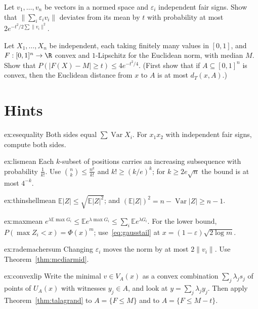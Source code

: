 \begin{exercise}[$\star\star$]\label{ex:rademachersum}
Let $v_1,\dots,v_n$ be vectors in a normed space and $\varepsilon_i$ independent fair signs. Show that $\|\sum_i\varepsilon_iv_i\|$ deviates from its mean by $t$ with probability at most
$2e^{-t^2/2\sum\|v_i\|^2}$.
\end{exercise}

\begin{exercise}[$\star\star\star$]\label{ex:convexlip}
Let $X_1,\dots,X_n$ be independent, each taking finitely many values in $[0,1]$, and $F:[0,1]^n\to\R$ convex and $1$-Lipschitz for the Euclidean norm, with median $M$. Show that
$P(|F(X)-M|\ge t)\le4e^{-t^2/4}$. (First show that if $A\subseteq[0,1]^n$ is convex, then the Euclidean distance from $x$ to $A$ is at most $d_T(x,A)$.)
\end{exercise}

\section{Hints}

\begin{hint}{ex:esequality}
Both sides equal $\sum\operatorname{Var}X_i$. For $x_1x_2$ with independent fair signs, compute both sides.
\end{hint}
\begin{hint}{ex:lismean}
Each $k$-subset of positions carries an increasing subsequence with probability $\frac1{k!}$. Use $\binom nk\le\frac{n^k}{k!}$ and $k!\ge(k/e)^k$; for $k\ge2e\sqrt n$ the bound is at most $4^{-k}$.
\end{hint}
\begin{hint}{ex:thinshellmean}
$\mathbb E|Z|\le\sqrt{\mathbb E|Z|^2}$; and $(\mathbb E|Z|)^2=n-\operatorname{Var}|Z|\ge n-1$.
\end{hint}
\begin{hint}{ex:maxmean}
$e^{\lambda\mathbb E\max G_i}\le\mathbb Ee^{\lambda\max G_i}\le\sum_i\mathbb Ee^{\lambda G_i}$. For the lower bound, $P(\max Z_i<x)=\Phi(x)^m$; use~\eqref{eq:gausstail} at $x=(1-\varepsilon)\sqrt{2\log m}$.
\end{hint}
\begin{hint}{ex:rademachersum}
Changing $\varepsilon_i$ moves the norm by at most $2\|v_i\|$. Use Theorem~\ref{thm:mcdiarmid}.
\end{hint}
\begin{hint}{ex:convexlip}
Write the minimal $v\in V_A(x)$ as a convex combination $\sum_j\lambda_js_j$ of points of $U_A(x)$ with witnesses $y_j\in A$, and look at $y=\sum_j\lambda_jy_j$. Then apply Theorem~\ref{thm:talagrand} to
$A=\{F\le M\}$ and to $A=\{F\le M-t\}$.
\end{hint}

